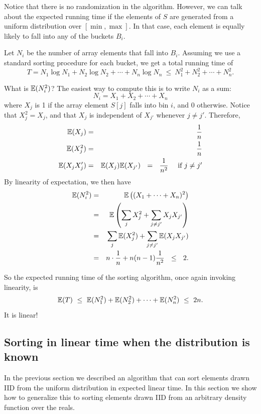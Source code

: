 Notice that there is no randomization in the algorithm. However, we can talk about
the expected running time if the elements of $S$ are generated from a uniform 
distribution over $[\min,\max]$. In that case, each element is equally likely to 
fall into any of the buckets $B_i$.

Let $N_i$ be the number of array elements that fall into $B_i$. Assuming
we use a standard sorting procedure for each bucket, we get a total running time of
$$ T = N_1 \log N_1 + N_2 \log N_2 + \cdots + N_n \log N_n \ \leq \ 
N_1^2 + N_2^2 + \cdots + N_n^2 .$$

What is $\mathbb{E}(N_i^2)$? The easiest way to compute this is to write $N_i$ as a sum:
$$ N_i = X_1 + X_2 + \cdots + X_n$$
where $X_j$ is 1 if the array element $S[j]$ falls into bin $i$, and 0 otherwise.
Notice that $X_j^2 = X_j$, and that $X_j$ is independent of $X_{j'}$ whenever $j \neq j'$.
Therefore,
\begin{eqnarray*}
\mathbb{E}(X_j)  &  = & \frac{1}{n} \\
\mathbb{E}(X_j^2) & = & \frac{1}{n} \\
\mathbb{E}(X_jX_j') & = & \mathbb{E}(X_j) \mathbb{E}(X_{j'}) \ \ = \ \ \frac{1}{n^2} \mbox{\ \ \ \ if $j \neq j'$}
\end{eqnarray*}
By linearity of expectation, we then have
\begin{eqnarray*}
\mathbb{E}(N_i^2) 
& = & \mathbb{E} \left( (X_1 + \cdots + X_n)^2 \right) \\
& = & \mathbb{E} \left( \sum_j X_j^2 + \sum_{j \neq j'} X_j X_{j'} \right) \\
& = & \sum_j \mathbb{E}(X_j^2) + \sum_{j \neq j'} \mathbb{E}(X_j X_{j'}) \\
& = & n \cdot \frac{1}{n} + n(n-1) \frac{1}{n^2} \ \ \leq \ \ 2.
\end{eqnarray*}

So the expected running time of the sorting algorithm, once again invoking linearity, is
$$ \mathbb{E}(T) 
\ \leq \ \mathbb{E}(N_1^2) + \mathbb{E}(N_2^2) + \cdots + \mathbb{E}(N_n^2) 
\ \leq \ 2n
.$$
It is linear!

\subsection{Sorting in linear time when the distribution is known}

In the previous section we described an algorithm that can sort
elements drawn IID from the uniform distribution in expected linear
time. In this section we show how to generalize this to sorting
elements drawn IID from an arbitrary density function over the reals.

